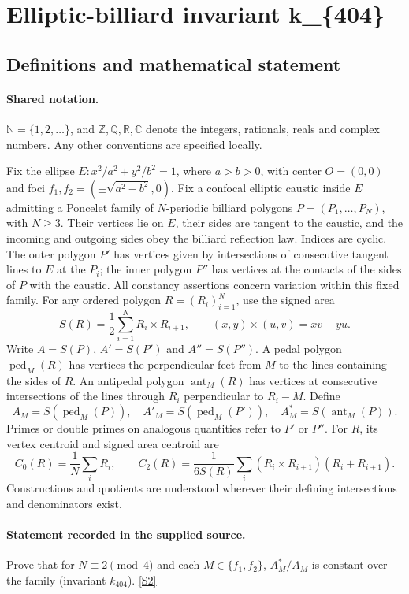 \documentclass[11pt]{article}
\newcommand{\sref}[2]{\hyperlink{source:#1:#2}{[S#2]}}
\begin{document}
\section{Elliptic-billiard invariant k\_\{404\}}\label{statement}

\subsection{Definitions and mathematical statement}

\paragraph{Shared notation.}$\mathbb N=\{1,2,\ldots\}$, and $\mathbb Z,\mathbb Q,\mathbb R,\mathbb C$ denote the integers, rationals, reals and complex numbers. Any other conventions are specified locally.


Fix the ellipse $E:x^2/a^2+y^2/b^2=1$, where $a>b>0$, with center $O=(0,0)$ and foci $f_1,f_2=(\pm\sqrt{a^2-b^2},0)$. Fix a confocal elliptic caustic inside $E$ admitting a Poncelet family of $N$-periodic billiard polygons $P=(P_1,\ldots,P_N)$, with $N\geq3$. Their vertices lie on $E$, their sides are tangent to the caustic, and the incoming and outgoing sides obey the billiard reflection law. Indices are cyclic. The outer polygon $P'$ has vertices given by intersections of consecutive tangent lines to $E$ at the $P_i$; the inner polygon $P''$ has vertices at the contacts of the sides of $P$ with the caustic. All constancy assertions concern variation within this fixed family.
For any ordered polygon $R=(R_i)_{i=1}^N$, use the signed area
\[S(R)=\frac12\sum_{i=1}^N R_i\times R_{i+1},\qquad (x,y)\times(u,v)=xv-yu.\]
Write $A=S(P)$, $A'=S(P')$ and $A''=S(P'')$. A pedal polygon $\operatorname{ped}_M(R)$ has vertices the perpendicular feet from $M$ to the lines containing the sides of $R$. An antipedal polygon $\operatorname{ant}_M(R)$ has vertices at consecutive intersections of the lines through $R_i$ perpendicular to $R_i-M$. Define
\[A_M=S(\operatorname{ped}_M(P)),\quad A'_M=S(\operatorname{ped}_M(P')),\quad A_M^*=S(\operatorname{ant}_M(P)).\]
Primes or double primes on analogous quantities refer to $P'$ or $P''$. For $R$, its vertex centroid and signed area centroid are
\[C_0(R)=\frac1N\sum_i R_i,\qquad C_2(R)=\frac{1}{6S(R)}\sum_i(R_i\times R_{i+1})(R_i+R_{i+1}).\]
Constructions and quotients are understood wherever their defining intersections and denominators exist.

\paragraph{Statement recorded in the supplied source.}
Prove that for $N\equiv2\pmod4$ and each $M\in\{f_1,f_2\}$, $A_M^*/A_M$ is constant over the family (invariant $k_{404}$). \sref{statement}{2}
\end{document}
